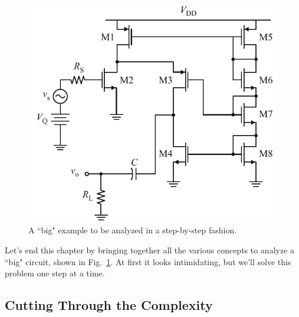 


\begin{figure}[tb]
\begin{center}
\includegraphics[scale=1]{16cascode_folded}
\end{center}
\caption{A ``big" example to be analyzed in a step-by-step fashion.} \label{fig:16cascode_folded}
\end{figure}

Let's end this chapter by bringing together all the various concepts to analyze a ``big" circuit, shown in Fig.~\ref{fig:16cascode_folded}.  At first it looks intimidating, but we'll solve this problem one step at a time.


\subsection{Cutting Through the Complexity}


